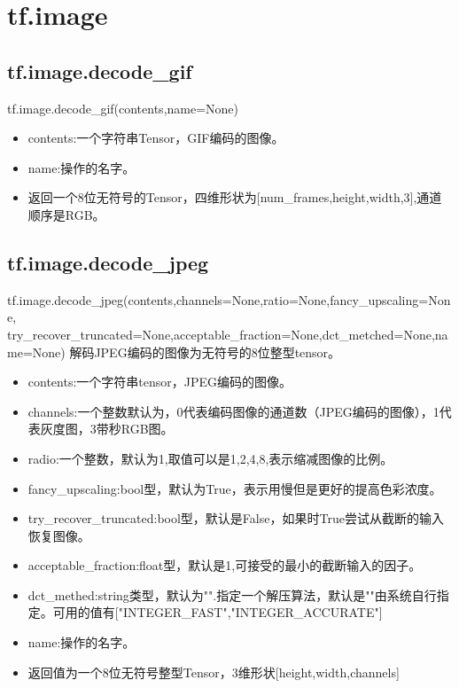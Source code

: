 \section{tf.image}
\subsection{tf.image.decode\_gif}
tf.image.decode\_gif(contents,name=None)
\begin{itemize}
\item contents:一个字符串Tensor，GIF编码的图像。
\item name:操作的名字。
\item 返回一个8位无符号的Tensor，四维形状为[num\_frames,height,width,3],通道顺序是RGB。
\end{itemize}
\subsection{tf.image.decode\_jpeg}
tf.image.decode\_jpeg(contents,channels=None,ratio=None,fancy\_upscaling=None,\newline
try\_recover\_truncated=None,acceptable\_fraction=None,dct\_metched=None,name=None)
解码JPEG编码的图像为无符号的8位整型tensor。\newline
\begin{itemize}
	\item contents:一个字符串tensor，JPEG编码的图像。
	\item channels:一个整数默认为，0代表编码图像的通道数（JPEG编码的图像），1代表灰度图，3带秒RGB图。
	\item radio:一个整数，默认为1,取值可以是1,2,4,8,表示缩减图像的比例。
	\item fancy\_upscaling:bool型，默认为True，表示用慢但是更好的提高色彩浓度。
	\item try\_recover\_truncated:bool型，默认是False，如果时True尝试从截断的输入恢复图像。
	\item acceptable\_fraction:float型，默认是1,可接受的最小的截断输入的因子。
	\item dct\_methed:string类型，默认为"".指定一个解压算法，默认是""由系统自行指定。可用的值有["INTEGER\_FAST","INTEGER\_ACCURATE"]
	\item name:操作的名字。
	\item 返回值为一个8位无符号整型Tensor，3维形状[height,width,channels]
\end{itemize}
